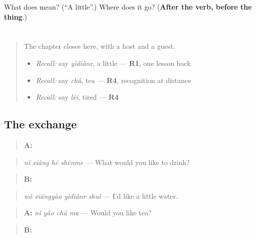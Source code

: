 \begin{tcolorbox}[breakable,colback=teal!4,colframe=teal!35!black,title={Before you move on}]
What does  mean? (\textquotedblleft{}A little\textquotedblright{}.) Where does it go? (\textbf{After the verb, before the thing}.)
\end{tcolorbox}
\section[Practice]{}

\label{lesson:ZH-C91-practice}



\begin{quote}
The chapter closes here, with a host and a guest.

\begin{itemize}
\raggedright
  \item \emph{Recall:} say \emph{yìdiǎnr}, a little — \textbf{R1}, one lesson back
  \item \emph{Recall:} say \emph{chá}, tea — \textbf{R4}, recognition at distance
  \item \emph{Recall:} say \emph{lèi}, tired — \textbf{R4}
\end{itemize}
\end{quote}

\subsection*{The exchange}
\begin{quote}
\textbf{A:} 
\end{quote}

\begin{quote}
\emph{nǐ xiǎng hē shénme} — What would you like to drink?
\end{quote}

\begin{quote}
\textbf{B:} 
\end{quote}

\begin{quote}
\emph{wǒ xiǎngyào yìdiǎnr shuǐ} — I'd like a little water.
\end{quote}

\begin{quote}
\textbf{A:} \emph{nǐ yào chá ma} — Would you like tea?
\end{quote}

\begin{quote}
\textbf{B:}  
\end{quote}

